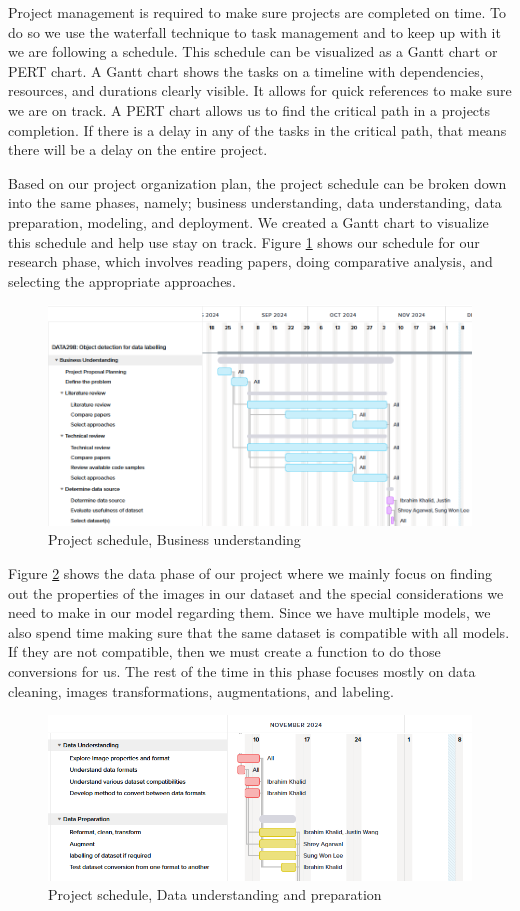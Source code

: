 \documentclass[stu,12pt,floatsintext]{apa7}
\begin{document}
Project management is required to make sure projects are completed on time. To do so we use the waterfall technique to task management and to keep up with it we are following a schedule. This schedule can be visualized as a Gantt chart or PERT chart. A Gantt chart shows the tasks on a timeline with dependencies, resources, and durations clearly visible. It allows for quick references to make sure we are on track. A PERT chart allows us to find the critical path in a projects completion. If there is a delay in any of the tasks in the critical path, that means there will be a delay on the entire project.

Based on our project organization plan, the project schedule can be broken down into the same phases, namely; business understanding, data understanding, data preparation, modeling, and deployment. We created a Gantt chart to visualize this schedule and help use stay on track. Figure \ref{fig:gantt_1} shows our schedule for our research phase, which involves reading papers, doing comparative analysis, and selecting the appropriate approaches.

\begin{figure}[!htb]
    \centering
    \includegraphics[width=0.8\linewidth]{images/gantt/gantt_1.png}
    \caption{Project schedule, Business understanding}
    \label{fig:gantt_1}
\end{figure}

Figure \ref{fig:gantt_2} shows the data phase of our project where we mainly focus on finding out the properties of the images in our dataset and the special considerations we need to make in our model regarding them. Since we have multiple models, we also spend time making sure that the same dataset is compatible with all models. If they are not compatible, then we must create a function to do those conversions for us. The rest of the time in this phase focuses mostly on data cleaning, images transformations, augmentations, and labeling. 

\begin{figure}[!htb]
    \centering
    \includegraphics[width=0.8\linewidth]{images/gantt/gantt_2.png}
    \caption{Project schedule, Data understanding and preparation}
    \label{fig:gantt_2}
\end{figure}
\end{document}
